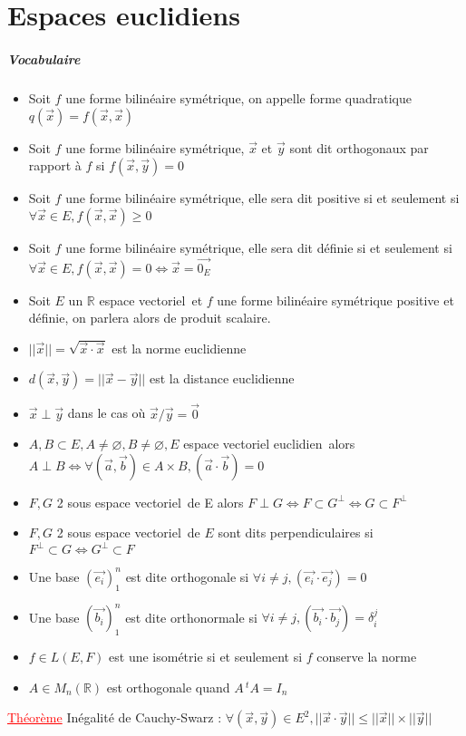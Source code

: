 \documentclass[a4paper, 11pt, french]{article}
\newcommand{\R}{\mathbb{R}}
\newcommand{\ev}{espace vectoriel}
\newcommand{\eve}{espace vectoriel euclidien}
\newcommand{\de}{\delta}
\newcommand{\thm}{\textcolor{red}{\underline{Théorème} }}
\begin{document}
	\section*{Espaces euclidiens}
	\subparagraph*{Vocabulaire}
	\begin{itemize}
 		\item Soit $f$ une forme bilinéaire symétrique, on appelle forme quadratique $q(\vec{x})=f(\vec{x},\vec{x})$
		\item Soit $f$ une forme bilinéaire symétrique, $\vec{x}$ et $\vec{y}$ sont dit orthogonaux par rapport à $f$ si $f(\vec{x},\vec{y})=0$
		\item Soit $f$ une forme bilinéaire symétrique, elle sera dit positive si et seulement si $\forall \vec{x} \in  E, f(\vec{x},\vec{x})\geqslant 0$
		\item Soit $f$ une forme bilinéaire symétrique, elle sera dit définie si et seulement si ${\forall \vec{x} \in  E}, f(\vec{x},\vec{x})=0 \iff \vec{x}=\vec{0_E}$
		\item Soit $E$ un $\R$ \ev \, et $f$ une forme bilinéaire symétrique positive et définie, on parlera alors de produit scalaire.
		\item $||\vec{x}||=\sqrt{\vec{x} \cdot \vec{x}}$ est la norme euclidienne
		\item $d(\vec{x},\vec{y})=||\vec{x}-\vec{y}||$ est la distance euclidienne
		\item $\vec{x}\perp\vec{y}$ dans le cas où $\vec{x}/\vec{y}=\vec{0}$
		\item $A,B \subset E, A \neq \varnothing, B \neq \varnothing, E$ \eve \, alors $A\perp B \iff {\forall (\vec{a},\vec{b}) \in A\times B}, {(\vec{a}\cdot\vec{b})=0}$
		\item $F,G$ 2 sous \ev \, de E alors $F\perp G \iff F\subset G^{\perp} \iff G \subset F^{\perp}$
		\item $F,G$ 2 sous \ev \, de $E$ sont dits perpendiculaires si ${F^{\perp} \subset G \iff G^{\perp} \subset F}$
		\item Une base $(\vec{e_i})_1^n$ est dite orthogonale si $\forall i \neq j, (\vec{e_i}\cdot \vec{e_j})=0$
		\item Une base $(\vec{b_i})_1^n$ est dite orthonormale si $\forall i \neq j, (\vec{b_i}\cdot \vec{b_j})=\de_i^j$
		\item $f \in L(E,F)$ est une isométrie si et seulement si $f$ conserve la norme 
		\item $A \in M_n(\R)$ est orthogonale quand $A\,^tA=I_n$
	\end{itemize}
	 \thm Inégalité de Cauchy-Swarz : $\forall (\vec{x},\vec{y}) \in E^2, ||\vec{x}\cdot\vec{y}|| \leqslant ||\vec{x}|| \times ||\vec{y}||$ \\
\end{document}
